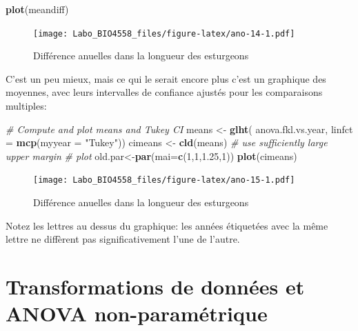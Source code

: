 \documentclass[12pt,]{book}
\newenvironment{Shaded}{\begin{snugshade}}{\end{snugshade}}
\newcommand{\CommentTok}[1]{\textcolor[rgb]{0.37,0.37,0.37}{\textit{#1}}}
\newcommand{\DataTypeTok}[1]{\textcolor[rgb]{0.27,0.27,0.27}{#1}}
\newcommand{\DecValTok}[1]{\textcolor[rgb]{0.06,0.06,0.06}{#1}}
\newcommand{\FloatTok}[1]{\textcolor[rgb]{0.06,0.06,0.06}{#1}}
\newcommand{\KeywordTok}[1]{\textcolor[rgb]{0.27,0.27,0.27}{\textbf{#1}}}
\newcommand{\NormalTok}[1]{#1}
\newcommand{\StringTok}[1]{\textcolor[rgb]{0.5,0.5,0.5}{#1}}
\begin{document}
\begin{Shaded}
\begin{Highlighting}[]
\KeywordTok{plot}\NormalTok{(meandiff)}
\end{Highlighting}
\end{Shaded}

\begin{figure}
\centering
\texttt{[image: Labo\_BIO4558\_files/figure-latex/ano-14-1.pdf]}
\caption{\label{fig:ano-14}Différence anuelles dans la longueur des esturgeons}
\end{figure}

C'est un peu mieux, mais ce qui le serait encore plus c'est un graphique des moyennes, avec leurs intervalles de confiance ajustés pour les comparaisons multiples:

\begin{Shaded}
\begin{Highlighting}[]
\CommentTok{# Compute and plot means and Tukey CI}
\NormalTok{means <-}\StringTok{ }\KeywordTok{glht}\NormalTok{(}
\NormalTok{  anova.fkl.vs.year,}
  \DataTypeTok{linfct =} \KeywordTok{mcp}\NormalTok{(}\DataTypeTok{myyear =} \StringTok{"Tukey"}\NormalTok{))}
\NormalTok{cimeans <-}\StringTok{ }\KeywordTok{cld}\NormalTok{(means)}
\CommentTok{# use sufficiently large upper margin}
\CommentTok{# plot}
\NormalTok{old.par<-}\KeywordTok{par}\NormalTok{(}\DataTypeTok{mai=}\KeywordTok{c}\NormalTok{(}\DecValTok{1}\NormalTok{,}\DecValTok{1}\NormalTok{,}\FloatTok{1.25}\NormalTok{,}\DecValTok{1}\NormalTok{))}
\KeywordTok{plot}\NormalTok{(cimeans)}
\end{Highlighting}
\end{Shaded}

\begin{figure}
\centering
\texttt{[image: Labo\_BIO4558\_files/figure-latex/ano-15-1.pdf]}
\caption{\label{fig:ano-15}Différence anuelles dans la longueur des esturgeons}
\end{figure}

Notez les lettres au dessus du graphique: les années étiquetées avec la même lettre ne diffèrent pas significativement l'une de l'autre.

\hypertarget{transformations-de-donnuxe9es-et-anova-non-paramuxe9trique}{%
\section{Transformations de données et ANOVA non-paramétrique}\label{transformations-de-donnuxe9es-et-anova-non-paramuxe9trique}}
\end{document}
